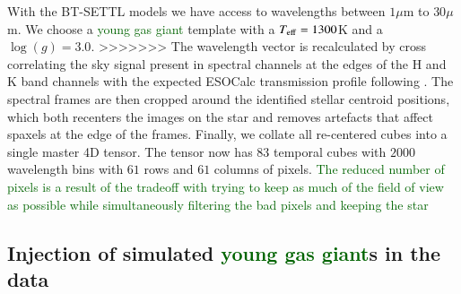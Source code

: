 \documentclass{aa}
\newcommand{\newchange}[1]{\textcolor{darkgreen}{#1}}
\begin{document}
{With the BT-SETTL models we have access to wavelengths between $1\mu$m to $30\mu$m.
We choose a \newchange{young gas giant} template with a $T_{\rm eff} = 1300$K and a $\log(g)=3.0$.
>>>>>>>
The wavelength vector is recalculated by cross correlating the sky signal present in spectral channels at the edges of the H and K band channels with the expected ESOCalc transmission profile following \cite{2018AHoeijmakersMM}. 
The spectral frames are then cropped around the identified stellar centroid positions, which both recenters the images on the star and removes artefacts that affect spaxels at the edge of the frames.
Finally, we collate all re-centered cubes into a single master 4D tensor.
The tensor now has $83$ temporal cubes with $2000$ wavelength bins with $61$ rows and $61$ columns of pixels.
\newchange{The reduced number of pixels is a result of the tradeoff with trying to keep as much of the field of view as possible while simultaneously filtering the bad pixels and keeping the star}

\subsection{Injection of simulated \newchange{young gas giant}s in the data}\label{sec: FC insertion}

}
\end{document}
